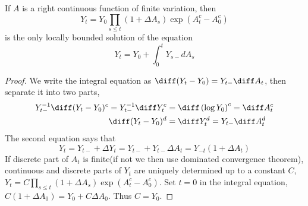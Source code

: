 \begin{itemize}
\begin{proposition}
If $A$ is a right continuous function of finite variation, then
	\[
	Y_{t}=Y_{0} \prod_{s \leq t}\left(1+\Delta A_{s}\right) \exp \left(A_{t}^{c}-A_{0}^{c}\right)
	\]
	is the only locally bounded solution of the equation
\[ 	Y_{t}=Y_{0}+\int_{0}^{t} Y_{s-} d A_{s} \]
\begin{proof}
	We write the integral equation as $ \diff (Y_{t}-Y_{0}) =Y_{t-}\diff A_{t} $, then separate it into two parts,
	\[
	\begin{aligned}
	 Y_{t-}^{-1}\diff (Y_{t}-Y_{0})^{c} = Y_{t-}^{-1}\diff Y_{t}^{c} &=\diff\left(  \log {Y_{0}}\right) ^{c}=\diff A_{t}^{c}  \\
	  \diff (Y_{t}-Y_{0})^{d} &= \diff Y_{t}^{d}=Y_{t-}\diff A_{t}^{d} 
	\end{aligned} 
	 \]
The second equation says that 
\[ Y_{t}=Y_{t-}+\Delta Y_{t}=Y_{t-}+Y_{t-}\Delta A_{t}=Y_{-t}( 1+\Delta A_{t}) \]
If discrete part of $ A_{t} $ is finite(if not we then use dominated convergence theorem), continuous and discrete parts of $ Y_{t} $ are uniquely determined up to a constant $ C $,
$ Y_{t}=C \prod_{s \leq t}\left(1+\Delta A_{s}\right) \exp \left(A_{t}^{c}-A_{0}^{c}\right) $.  Set $ t=0 $ in the integral equation, $ C(1+\Delta A_{0})=Y_{0}+ C \Delta A_{0}$. Thus $ C=Y_{0} $.
\end{proof}
\end{proposition}

\end{itemize}

